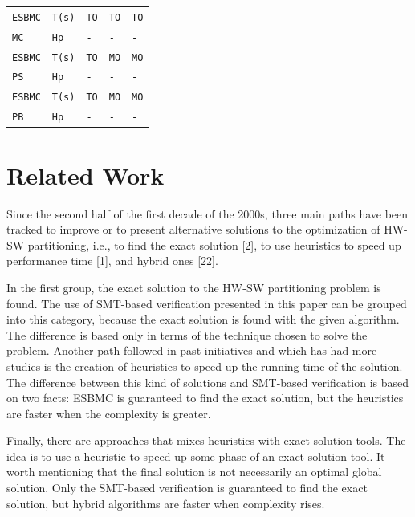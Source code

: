 \begin{table}[h]
\begin{tabular}[c]{m{1.3cm}m{1.25cm}|m{1.25cm}|m{1.25cm}|m{1.25cm}}
\verb|ESBMC| & \verb|T(s)|  & \verb|TO|  & \verb|TO| & \verb|TO|\\
\verb|MC| & \verb|Hp| & \verb|-|  & \verb|-| & \verb|-|\\
\hline

\rowcolor{Gray}
\verb|ESBMC| & \verb|T(s)| & \verb|TO|  & \verb|MO| & \verb|MO|\\
\rowcolor{Gray}
\verb|PS| & \verb|Hp| & \verb|-|  & \verb|-| & \verb|-|\\
\hline

\verb|ESBMC| & \verb|T(s)| & \verb|TO|  & \verb|MO| & \verb|MO|\\
\verb|PB| & \verb|Hp| & \verb|-|  & \verb|-| & \verb|-|\\
\bottomrule[1.5pt]

\end{tabular}
\end{table}

\section{Related Work}

Since the second half of the first decade of the 2000s, three main paths have been tracked to improve or to present alternative solutions to the optimization of HW-SW partitioning, i.e., to find the exact solution [2], to use heuristics to speed up performance time [1], and hybrid ones [22].

In the first group, the exact solution to the HW-SW partitioning problem is found. The use of SMT-based verification presented in this paper can be grouped into this category, because the exact solution is found with the given algorithm. The difference is based only in terms of the technique chosen to solve the problem.
Another path followed in past initiatives and which has had more studies is the creation of heuristics to speed up the running time of the solution. The difference between this kind of solutions and SMT-based verification is based on two facts: ESBMC is guaranteed to find the exact solution, but the heuristics are faster when the complexity is greater.

Finally, there are approaches that mixes heuristics with exact solution tools. The idea is to use a heuristic to speed up some phase of an exact solution tool. It worth mentioning that the final solution is not necessarily an optimal global solution. Only the SMT-based verification is guaranteed to find the exact solution, but hybrid algorithms are faster when complexity rises.

